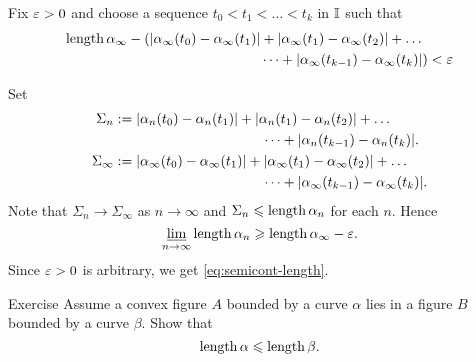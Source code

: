 Fix $\varepsilon > 0$ and choose a sequence $t_0<t_1<\dots<t_k$ in $\mathbb{I}$
such that 
\begin{align*}
\mathop{\rm length}\nolimits\alpha_\infty-
(|\alpha_\infty(t_0)-\alpha_\infty(t_1)|&+|\alpha_\infty(t_1)-\alpha_\infty(t_2)|+\dots
\\
&\dots+|\alpha_\infty(t_{k-1})-\alpha_\infty(t_k)|)<\varepsilon
\end{align*}


Set 
\begin{align*}\Sigma_n
&\df
|\alpha_n(t_0)-\alpha_n(t_1)|+|\alpha_n(t_1)-\alpha_n(t_2)|+\dots
\\
&\ \ \ \ \ \ \ \ \ \ \ \ \ \ \ \ \ \ \ \ \ \ \ \ \ \ \ \ \ \ \ \ \dots+|\alpha_n(t_{k-1})-\alpha_n(t_k)|.
\\
\Sigma_\infty
&\df
|\alpha_\infty(t_0)-\alpha_\infty(t_1)|+|\alpha_\infty(t_1)-\alpha_\infty(t_2)|+\dots
\\
&\ \ \ \ \ \ \ \ \ \ \ \ \ \ \ \ \ \ \ \ \ \ \ \ \ \ \ \ \ \ \ \ \dots+|\alpha_\infty(t_{k-1})-\alpha_\infty(t_k)|.
\end{align*}
Note that $\Sigma_n\to \Sigma_\infty$ as $n\to\infty$
and $\Sigma_n\leqslant\mathop{\rm length}\nolimits\alpha_n$ for each $n$.
Hence
$$\varliminf_{n\to\infty} \mathop{\rm length}\nolimits\alpha_n \geqslant \mathop{\rm length}\nolimits\alpha_\infty-\varepsilon.$$
Since $\varepsilon>0$ is arbitrary, we get \ref{eq:semicont-length}.\qeds


\begin{thm}{Exercise}
Assume a convex figure $A$ bounded by a curve $\alpha$ lies in a figure $B$ bounded by a curve $\beta$.
Show that 
\[\mathop{\rm length}\nolimits\alpha\leqslant \mathop{\rm length}\nolimits\beta.\]
\end{thm}


